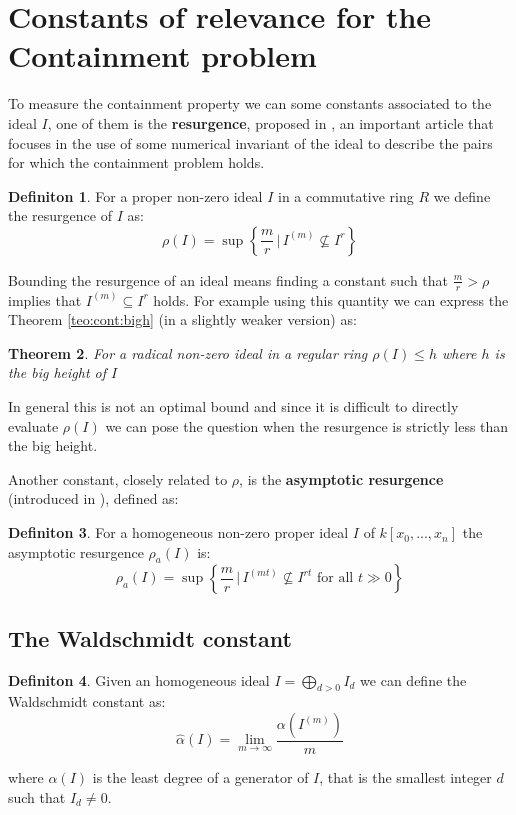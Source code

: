 \documentclass[a4wide]{book}
\theoremstyle{plain}
\newtheorem{teo}{Theorem}[section]
\theoremstyle{remark}
\theoremstyle{definition}
\newtheorem{deff}[teo]{Definiton}
\newcommand{\cont}[2]{ I^{(#1)} \subseteq I^{#2}}
\newcounter{que}
\begin{document}
\section[Constants of relevance]{Constants of relevance for the Containment problem}
To measure the containment property we can some constants associated to the ideal $ I $, one of them is the \textbf{resurgence}, proposed in \cite{Boc09resurgence}, an important article that focuses in the use of some numerical invariant of the ideal to describe the pairs for which the containment problem holds. 
\begin{deff}
	For a proper non-zero ideal $ I $ in a commutative ring $ R $ we define the resurgence of $ I $ as:
	\begin{equation*}
		\rho(I)= \sup \left\lbrace \frac{m}{r} \, | \, I^{(m)} \not \subseteq I^r \right\rbrace 
	\end{equation*}
\end{deff}
Bounding the resurgence of an ideal means finding a constant such that $ \frac{m}{r} > \rho $ implies that $ \cont{m}{r} $ holds.
For example using this quantity we can express the Theorem \ref{teo:cont:bigh} (in a slightly weaker version) as:
\begin{teo}
	For a radical non-zero ideal in a regular ring $ \rho(I) \leq h $ where $ h $ is the big height of $ I $
\end{teo}
In general this is not an optimal bound and since it is difficult to directly evaluate $ \rho(I) $ we can pose the question when the resurgence is strictly less than the big height. 

Another constant, closely related to $ \rho $, is the \textbf{asymptotic resurgence} (introduced in \cite{Guardo2012}), defined as:
\begin{deff}
	For a homogeneous non-zero proper ideal $ I $ of $ k[x_0 , ... , x_n] $ the asymptotic resurgence $ \rho_a(I) $ is:
	\[ \rho_a(I) = \sup \left\lbrace \frac{m}{r} \, | \, I^{(mt)} \not \subseteq I^{rt} \text{ for all } t \gg 0 \right\rbrace \]
\end{deff}
	
\subsection{The Waldschmidt constant}

\begin{deff}\label{def:walds}
Given an homogeneous ideal $ I = \bigoplus_{d>0} I_d$ we can define the Waldschmidt constant as:
\[
\hat{\alpha}(I) = \lim_{m \to \infty} \frac{\alpha (I^{(m)})   }{m}
\]

where $ \alpha(I) $ is the least degree of a generator of $ I $, that is the smallest integer $ d $ such that $ I_d \neq 0 $.
\end{deff}
\end{document}
